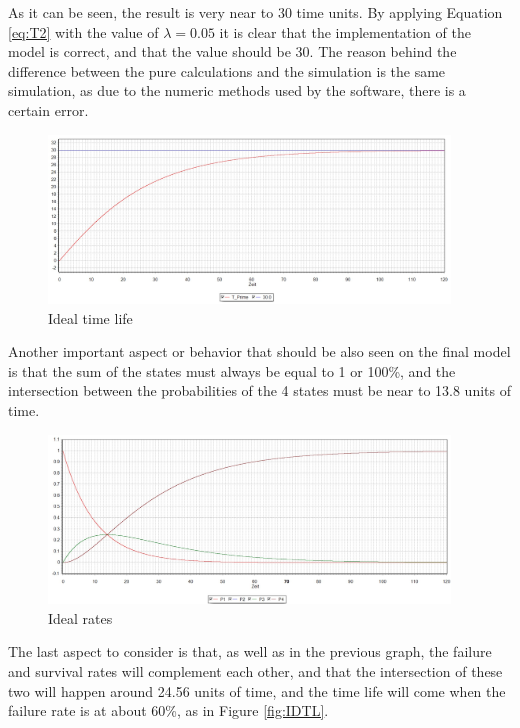 \documentclass{article}
\begin{document}
\begin{doublespacing}
\par As it can be seen, the result is very near to 30 time units. By applying Equation \ref{eq:T2} with the value of ${\lambda} = 0.05$ it is clear that the implementation of the model is correct, and that the value should be 30. The reason behind the difference between the pure calculations and the simulation is the same simulation, as due to the numeric methods used by the software, there is a certain error.

\begin{figure}[H] 
    \centering
    \includegraphics[width=0.95\textwidth]{Images/TimeLifeIdeal.JPG} 
    \caption{Ideal time life} 
    \label{fig:IdealT} 
\end{figure}

\par Another important aspect or behavior that should be also seen on the final model is that the sum of the states must always be equal to 1 or 100\%, and the intersection between the probabilities of the 4 states must be near to 13.8 units of time.

\begin{figure}[H] 
    \centering
    \includegraphics[width=0.95\textwidth]{Images/StatesIdeal.JPG} 
    \caption{Ideal rates} 
    \label{fig:IdealRates} 
\end{figure}

\par The last aspect to consider is that, as well as in the previous graph, the failure and survival rates will complement each other, and that the intersection of these two will happen around 24.56 units of time, and the time life will come when the failure rate is at about 60\%, as in Figure \ref{fig:IDTL}.


\end{doublespacing}
\end{document}
